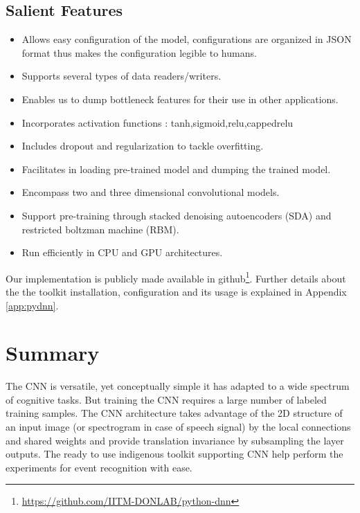 \subsection{Salient Features}
\begin{itemize}
	\item Allows easy configuration of the model, configurations are organized in JSON format thus makes the configuration legible to humans.
	\item Supports several types of data readers/writers. 
	\item Enables us to dump bottleneck features for their use in other applications.
	\item Incorporates activation functions : tanh,sigmoid,relu,cappedrelu
	\item Includes dropout and regularization to tackle overfitting.
	\item Facilitates in loading pre-trained model and dumping the trained model.
	\item Encompass two and three dimensional convolutional models.
	\item Support pre-training through stacked denoising autoencoders (SDA) and restricted boltzman machine (RBM).
	\item Run efficiently in CPU and GPU architectures.	
\end{itemize}
Our implementation is publicly made available in github\footnote{\url{https://github.com/IITM-DONLAB/python-dnn}}. Further details about the the toolkit installation, configuration and its usage is explained in Appendix \ref{app:pydnn}.

\section{Summary}
The CNN is versatile, yet conceptually simple it has adapted to a wide spectrum of cognitive tasks. But training the CNN  requires a large number of labeled training samples. The CNN architecture takes advantage of the 2D structure of an input image (or spectrogram in case of speech signal) by the local connections and shared weights and provide translation invariance by subsampling the layer outputs. The ready to use indigenous toolkit supporting CNN help perform the experiments for event recognition with ease.